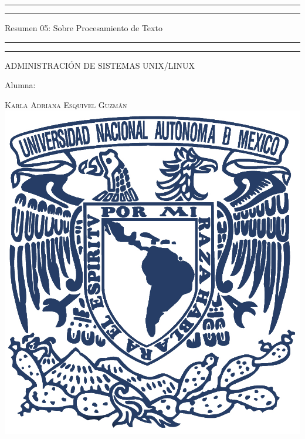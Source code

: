 \documentclass[a4paper, 11pt, oneside]{article}
\begin{document}
 

\begin{titlepage} 

	\centering 
	
	\scshape 
	
	\vspace*{\baselineskip} 
	
	
	
	\rule{\textwidth}{1.6pt}\vspace*{-\baselineskip}\vspace*{2pt} 
	\rule{\textwidth}{0.4pt} 
	
	\vspace{0.75\baselineskip} 
	
	{\LARGE Resumen 05: Sobre Procesamiento de Texto}	
	\vspace{0.75\baselineskip} 
	
	\rule{\textwidth}{0.4pt}\vspace*{-\baselineskip}\vspace{3.2pt}
	\rule{\textwidth}{1.6pt} 
	
	\vspace{2\baselineskip} 
	

	ADMINISTRACIÓN DE SISTEMAS UNIX/LINUX
	
	\vspace*{3\baselineskip} 
	
	
	
	Alumna:
	
	\vspace{0.5\baselineskip} 
	
	{\scshape\Large Karla Adriana Esquivel Guzmán \\} 
	\vspace{0.5\baselineskip} 
	\vfill
	\includegraphics{unam.jpg}
	

\end{titlepage}
\end{document}
